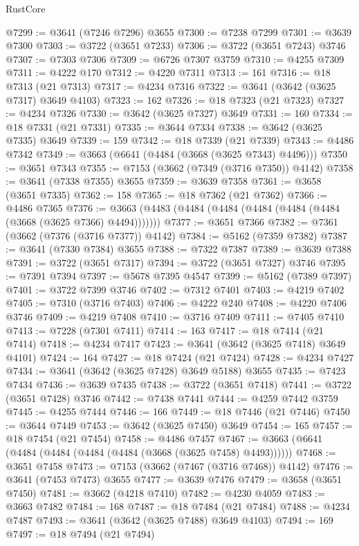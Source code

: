 \begin{lexlean}{RustCore}
\begin{coremodule}
@7299 := @3641 (@7246 @7296) @3655
@7300 := @7238 @7299
@7301 := @3639 @7300
@7303 := @3722 (@3651 @7233)
@7306 := @3722 (@3651 @7243) @3746
@7307 := @7303 @7306
@7309 := @6726 @7307 @3759
@7310 := @4255 @7309
@7311 := @4222 @170
@7312 := @4220 @7311
@7313 := 161
@7316 := @18 @7313 (@21 @7313)
@7317 := @4234 @7316
@7322 := @3641 (@3642 (@3625 @7317) @3649 @4103)
@7323 := 162
@7326 := @18 @7323 (@21 @7323)
@7327 := @4234 @7326
@7330 := @3642 (@3625 @7327) @3649
@7331 := 160
@7334 := @18 @7331 (@21 @7331)
@7335 := @3644 @7334
@7338 := @3642 (@3625 @7335) @3649
@7339 := 159
@7342 := @18 @7339 (@21 @7339)
@7343 := @4486 @7342
@7349 := @3663 (@6641 (@4484 (@3668 (@3625 @7343) @4496)))
@7350 := @3651 @7343
@7355 := @7153 (@3662 (@7349 (@3716 @7350)) @4142)
@7358 := @3641 (@7338 @7355) @3655
@7359 := @3639 @7358
@7361 := @3658 (@3651 @7335)
@7362 := 158
@7365 := @18 @7362 (@21 @7362)
@7366 := @4486 @7365
@7376 := @3663 (@4483 (@4484 (@4484 (@4484 (@4484 (@4484 (@3668 (@3625 @7366) @4494)))))))
@7377 := @3651 @7366
@7382 := @7361 (@3662 (@7376 (@3716 @7377)) @4142)
@7384 := @5162 (@7359 @7382)
@7387 := @3641 (@7330 @7384) @3655
@7388 := @7322 @7387
@7389 := @3639 @7388
@7391 := @3722 (@3651 @7317)
@7394 := @3722 (@3651 @7327) @3746
@7395 := @7391 @7394
@7397 := @5678 @7395 @4547
@7399 := @5162 (@7389 @7397)
@7401 := @3722 @7399 @3746
@7402 := @7312 @7401
@7403 := @4219 @7402
@7405 := @7310 (@3716 @7403)
@7406 := @4222 @240
@7408 := @4220 @7406 @3746
@7409 := @4219 @7408
@7410 := @3716 @7409
@7411 := @7405 @7410
@7413 := @7228 (@7301 @7411)
@7414 := 163
@7417 := @18 @7414 (@21 @7414)
@7418 := @4234 @7417
@7423 := @3641 (@3642 (@3625 @7418) @3649 @4101)
@7424 := 164
@7427 := @18 @7424 (@21 @7424)
@7428 := @4234 @7427
@7434 := @3641 (@3642 (@3625 @7428) @3649 @5188) @3655
@7435 := @7423 @7434
@7436 := @3639 @7435
@7438 := @3722 (@3651 @7418)
@7441 := @3722 (@3651 @7428) @3746
@7442 := @7438 @7441
@7444 := @4259 @7442 @3759
@7445 := @4255 @7444
@7446 := 166
@7449 := @18 @7446 (@21 @7446)
@7450 := @3644 @7449
@7453 := @3642 (@3625 @7450) @3649
@7454 := 165
@7457 := @18 @7454 (@21 @7454)
@7458 := @4486 @7457
@7467 := @3663 (@6641 (@4484 (@4484 (@4484 (@4484 (@3668 (@3625 @7458) @4493))))))
@7468 := @3651 @7458
@7473 := @7153 (@3662 (@7467 (@3716 @7468)) @4142)
@7476 := @3641 (@7453 @7473) @3655
@7477 := @3639 @7476
@7479 := @3658 (@3651 @7450)
@7481 := @3662 (@4218 @7410)
@7482 := @4230 @4059
@7483 := @3663 @7482
@7484 := 168
@7487 := @18 @7484 (@21 @7484)
@7488 := @4234 @7487
@7493 := @3641 (@3642 (@3625 @7488) @3649 @4103)
@7494 := 169
@7497 := @18 @7494 (@21 @7494)

\end{coremodule}
\end{lexlean}
